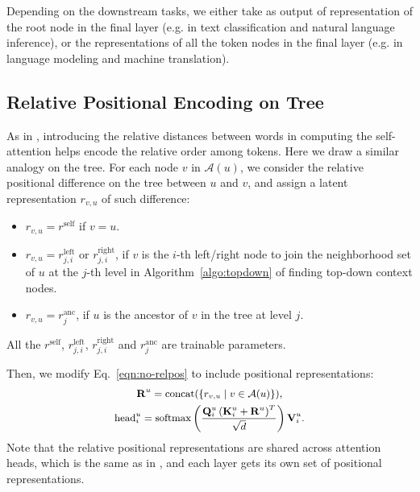 \documentclass[11pt,a4paper]{article}
\begin{document}
Depending on the downstream tasks, we either take as output of representation of the root node in the final layer (e.g. in text classification and natural language inference), or the representations of all the token nodes in the final layer (e.g. in language modeling and machine translation).

\subsection{Relative Positional Encoding on Tree}

As in \cite{shaw2018self}, introducing the relative distances between words in computing the self-attention helps encode the relative order among tokens.
Here we draw a similar analogy on the tree.
For each node $v$ in $\mathcal{A}(u)$, we consider the relative positional difference on the tree between $u$ and $v$, and assign a latent representation $r_{v,u}$ of such difference:

\begin{itemize}
    \item $r_{v, u} = r^{\text{self}}$ if $v = u$.
    \item $r_{v, u} = r^{\text{left}}_{j, i}$ or $r^{\text{right}}_{j, i}$, if $v$ is the $i$-th left/right node to join the neighborhood set of $u$ at the $j$-th level in Algorithm~\ref{algo:topdown} of finding top-down context nodes.
    \item $r_{v, u} = r^{\text{anc}}_j$, if $u$ is the ancestor of $v$ in the tree at level $j$.

\end{itemize}

All the $r^{\text{self}}$, $r^{\text{left}}_{j,i}$, $r^{\text{right}}_{j,i}$ and $r^{\text{anc}}_j$  are trainable parameters.

Then, we modify Eq.~\eqref{eqn:no-relpos} to include positional representations:
\begin{equation}\small
\begin{gathered}
    \mathbf{R}^u = \text{concat}(\{r_{v,u} \mid v \in \mathcal{A}(u)\}), \\
    \mathrm{head}_i^u = \text{softmax}\left(\dfrac{\mathbf{Q}^u_i \left(\mathbf{K}^u_i +  \mathbf{R}^u \right)^T}{\sqrt{d}}\right) \mathbf{V}^u_i.
\end{gathered}
\end{equation}
Note that the relative positional representations are shared across attention heads, which is the same as in \cite{shaw2018self}, and each layer gets its own set of positional representations.
\end{document}
